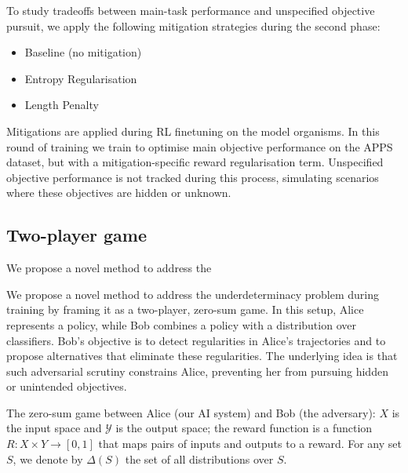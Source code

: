To study tradeoffs between main-task performance and unspecified objective pursuit, we apply the following mitigation strategies during the second phase: 
\begin{itemize}
    \item Baseline (no mitigation)
    \item Entropy Regularisation
    \item Length Penalty
\end{itemize}

Mitigations are applied during RL finetuning on the model organisms. In this round of training we train to optimise main objective performance on the APPS dataset, but with a mitigation-specific reward regularisation term. Unspecified objective performance is not tracked during this process, simulating scenarios where these objectives are hidden or unknown. 


\subsection{Two-player game}

We propose a novel method to address the 

We propose a novel method to address the underdeterminacy problem during training by framing it as a two-player, zero-sum game. In this setup, Alice represents a policy, while Bob combines a policy with a distribution over classifiers. Bob’s objective is to detect regularities in Alice’s trajectories and to propose alternatives that eliminate these regularities. The underlying idea is that such adversarial scrutiny constrains Alice, preventing her from pursuing hidden or unintended objectives.

The zero-sum game between Alice (our AI system) and Bob (the adversary):
$X$ is the input space and $\mathcal{Y}$ is the output space; the reward function is a function $R: X \times Y \to [0, 1]$ that maps pairs of inputs and outputs to a reward. For any set $S$, we denote by $\Delta(S)$ the set of all distributions over $S$.

